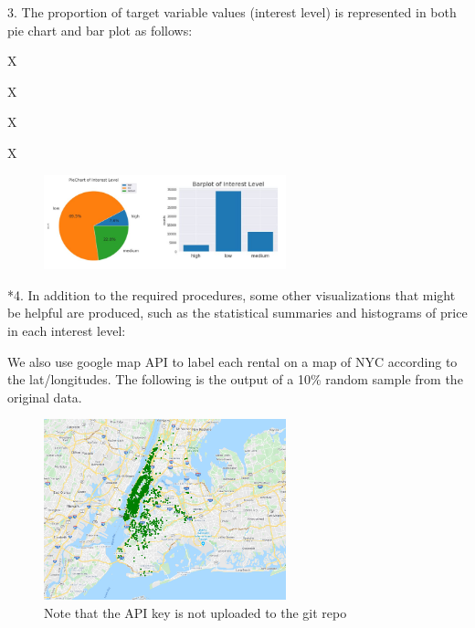 \documentclass[10pt,twocolumn,letterpaper]{article}
\begin{document}
3. The proportion of target variable values (interest level) is represented in both pie chart and bar plot as follows:

X

X

X

X



\begin{figure}[h!]
    \centering
    \includegraphics[width=7cm]{CMPT459_pair2.png}
    \caption{}
    \label{fig:galaxy}
\end{figure}


*4. In addition to the required procedures, some other visualizations that might be helpful are produced, such as the statistical summaries and histograms of price in each interest level:  


\begin{figure}[h!]%
    \centering
    \qquad
    \caption{}%
    \label{fig:example}%
\end{figure}


We also use google map API to label each rental on a map of NYC according to the lat/longitudes. The following is the output of a 10\% random sample from the original data. 


\begin{figure}[h!]
    \centering
    \includegraphics[width=7cm]{rents_sample.png}
    \caption{Note that the API key is not uploaded to the git repo}
    \label{fig:galaxy}
\end{figure}
\end{document}
